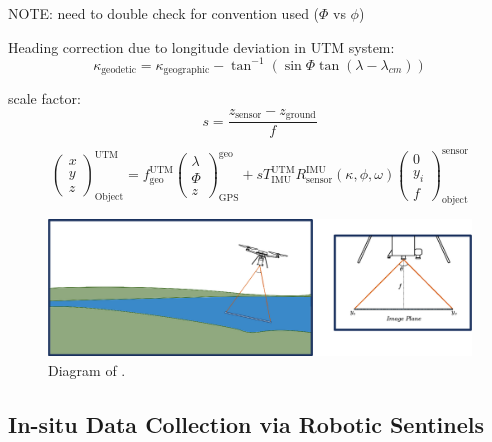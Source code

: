 \documentclass[remotesensing,article,submit,pdftex,moreauthors]{Definitions/mdpi}
\begin{document}
NOTE: need to double check \cite{GeorectificationMuller} for convention used ($\Phi$ vs $\phi$) 

Heading correction due to longitude deviation in UTM system: 
\begin{equation}
    \kappa_{\text{geodetic}} = \kappa_{\text{geographic}}-\tan^{-1}\left( \sin\Phi \tan(\lambda-\lambda_{cm}) \right)
\end{equation}

scale factor: 
\begin{equation}
    s = \frac{z_{\text{sensor}}-z_{\text{ground}}}{f}
\end{equation}

\begin{equation}
    \begin{pmatrix}
    x \\ y \\ z
    \end{pmatrix}_{\text{Object}}^{\text{UTM}} = 
    f_{\text{geo}}^{\text{UTM}}\begin{pmatrix}
    \lambda \\ 
    \Phi \\ 
    z
    \end{pmatrix}_{\text{GPS}}^{\text{geo}} + sT_{\text{IMU}}^{\text{UTM}}R_{\text{sensor}}^{\text{IMU}}(\kappa, \phi, \omega)\begin{pmatrix}
    0 \\ 
    y_i \\ 
    f
    \end{pmatrix}_{\text{object}}^{\text{sensor}}
\end{equation}


\begin{figure}[H]
\includegraphics[width=10.5 cm]{images/georectification/georectification.eps}
\caption{Diagram of .\label{georectification1}}
\end{figure}   



\subsection{In-situ Data Collection via Robotic Sentinels}
\end{document}
